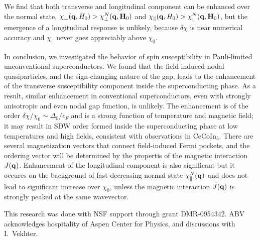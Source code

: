 \documentclass[aps,prl,twocolumn,showpacs,amsmath,amssymb]{revtex4-1}
\newcommand{\cecoin}{CeCoIn$_5$}
\begin{document}
We find that both transverse and longitudinal component can be enhanced over the normal state, 
$\chi_{\perp}({\bf q},H_0) > \chi^N_\perp({\bf q},{\bf H}_0)$
and
$\chi_{\parallel}({\bf q},H_0) > \chi^N_\parallel({\bf q},{\bf H}_0)$, but the emergence of a
 longitudinal response is unlikely, because $\delta \chi$ is near numerical accuracy and $\chi_{\parallel}$
 never goes appreciably above $\chi_0$.


In conclusion, we investigated the behavior of spin susceptibility in Pauli-limited 
unconventional superconductors. We found that the field-induced nodal quasiparticles, and the sign-changing 
nature of the gap, leads to the enhancement of the transverse susceptibility component 
inside the superconducting phase. 
As a result, similar enhancement in conventional superconductors, even with strongly anisotropic and even nodal 
gap function, is unlikely. \cite{Machida1981_sdw_sc}
The enhancement is of the order $\delta\chi/\chi_0 \sim \Delta_0/\epsilon_F$ 
and is a strong function of temperature and magnetic field; 
it may result in SDW order formed inside the superconducting phase at low temperatures and 
high fields, consistent with observations in \cecoin.  
There are several magnetization vectors that connect field-induced Fermi pockets, and the 
ordering vector will be determined by the propertis of the 
magnetic interaction $J({\bf q})$. 
Enhancement of the longitudinal component is also significant but it occures on the 
background of fast-decreasing normal state $\chi_\parallel^N({\bf q})$ and does not lead to 
significant increase over $\chi_0$, unless the magnetic interaction $J({\bf q})$ is strongly 
peaked at the same wavevector. 

This research was done with NSF support through grant DMR-0954342. 
ABV acknowledges hospitality of Aspen Center for Physics, and discussions with 
I.~Vekhter. 



\end{document}
